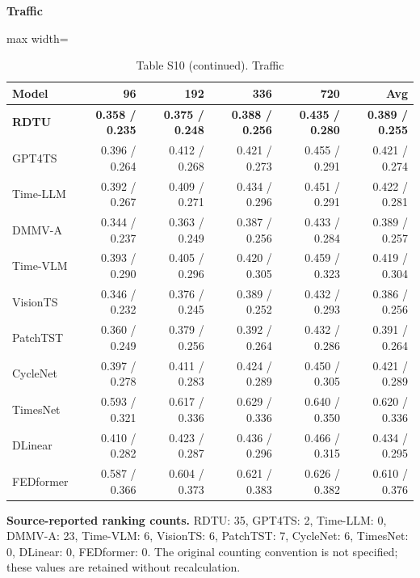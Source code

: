 \begin{table}[H]\centering\small
\caption*{Table S10 (continued). Traffic}
\textbf{Traffic}\par\smallskip
\begin{adjustbox}{max width=\linewidth}\begin{tabular}{lrrrrr}\toprule
\textbf{Model} & \textbf{96} & \textbf{192} & \textbf{336} & \textbf{720} & \textbf{Avg}\\\midrule
\rowcolor{blue!5}
\textbf{RDTU} & \textbf{0.358 / 0.235} & \textbf{0.375 / 0.248} & \textbf{0.388 / 0.256} & \textbf{0.435 / 0.280} & \textbf{0.389 / 0.255}\\
GPT4TS & 0.396 / 0.264 & 0.412 / 0.268 & 0.421 / 0.273 & 0.455 / 0.291 & 0.421 / 0.274\\
Time-LLM & 0.392 / 0.267 & 0.409 / 0.271 & 0.434 / 0.296 & 0.451 / 0.291 & 0.422 / 0.281\\
DMMV-A & 0.344 / 0.237 & 0.363 / 0.249 & 0.387 / 0.256 & 0.433 / 0.284 & 0.389 / 0.257\\
Time-VLM & 0.393 / 0.290 & 0.405 / 0.296 & 0.420 / 0.305 & 0.459 / 0.323 & 0.419 / 0.304\\
VisionTS & 0.346 / 0.232 & 0.376 / 0.245 & 0.389 / 0.252 & 0.432 / 0.293 & 0.386 / 0.256\\
PatchTST & 0.360 / 0.249 & 0.379 / 0.256 & 0.392 / 0.264 & 0.432 / 0.286 & 0.391 / 0.264\\
CycleNet & 0.397 / 0.278 & 0.411 / 0.283 & 0.424 / 0.289 & 0.450 / 0.305 & 0.421 / 0.289\\
TimesNet & 0.593 / 0.321 & 0.617 / 0.336 & 0.629 / 0.336 & 0.640 / 0.350 & 0.620 / 0.336\\
DLinear & 0.410 / 0.282 & 0.423 / 0.287 & 0.436 / 0.296 & 0.466 / 0.315 & 0.434 / 0.295\\
FEDformer & 0.587 / 0.366 & 0.604 / 0.373 & 0.621 / 0.383 & 0.626 / 0.382 & 0.610 / 0.376\\
\bottomrule\end{tabular}\end{adjustbox}\end{table}
\noindent\textbf{Source-reported ranking counts.} RDTU: 35, GPT4TS: 2, Time-LLM: 0, DMMV-A: 23, Time-VLM: 6, VisionTS: 6, PatchTST: 7, CycleNet: 6, TimesNet: 0, DLinear: 0, FEDformer: 0. The original counting convention is not specified; these values are retained without recalculation.\par
